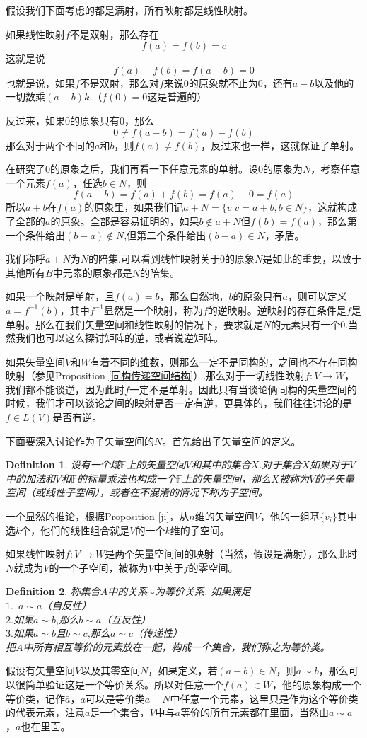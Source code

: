 \documentclass[11pt,a4paper,openany]{book}%
\theoremstyle{plain}%
\newtheorem{defi}{Definition}[chapter]%
\begin{document}
假设我们下面考虑的都是满射，所有映射都是线性映射。

如果线性映射$f$不是双射，那么存在
\[
f(a)=f(b)=c
\]
这就是说
\[
f(a)-f(b)=f(a-b)=0
\]
也就是说，如果$f$不是双射，那么对$f$来说$0$的原象就不止为0，还有$a-b$以及他的一切数乘$(a-b)k$.（$f(0)=0$这是普遍的）

反过来，如果0的原象只有0，那么
\[
0 \neq f(a-b)=f(a)-f(b)
\]
那么对于两个不同的$a$和$b$，则$f(a)\neq f(b)$，反过来也一样，这就保证了单射。

在研究了$0$的原象之后，我们再看一下任意元素的单射。设0的原象为$N$，考察任意一个元素$f(a)$，任选$b\in N$，则
\[
f(a+b)=f(a)+f(b)=f(a)+0=f(a)
\]
所以$a+b$在$f(a)$的原象里，如果我们记$a+N=\{v|v=a+b,b\in N\}$，这就构成了全部的$a$的原象。全部是容易证明的，如果$b\notin a+N$但$f(b)=f(a)$，那么第一个条件给出$(b-a) \notin N$,但第二个条件给出$(b-a) \in N$，矛盾。

我们称呼$a+N$为$N$的{\kaishu 陪集}.可以看到线性映射关于0的原象$N$是如此的重要，以致于其他所有$B$中元素的原象都是$N$的陪集。

如果一个映射是单射，且$f(a)=b$，那么自然地，$b$的原象只有$a$，则可以定义$a=f^{-1}(b)$，其中$f^{-1}$显然是一个映射，称为$f$的逆映射。逆映射的存在条件是$f$是单射。那么在我们矢量空间和线性映射的情况下，要求就是$N$的元素只有一个0.当然我们也可以这么探讨矩阵的逆，或者说逆矩阵。

如果矢量空间$V$和$W$有着不同的维数，则那么一定不是同构的，之间也不存在同构映射（参见Proposition \ref{同构传递空间结构}）.那么对于一切线性映射$f:V\rightarrow W$，我们都不能谈逆，因为此时$f$一定不是单射。因此只有当谈论俩同构的矢量空间的时候，我们才可以谈论之间的映射是否一定有逆，更具体的，我们往往讨论的是$f\in L(V)$是否有逆。

下面要深入讨论作为子矢量空间的$N$。首先给出子矢量空间的定义。
\begin{defi}
设有一个域$\mathbb{F}$上的矢量空间$V$和其中的集合$X$.对于集合$X$如果对于$V$中的加法和$V$和$\mathbb{F}$的标量乘法也构成一个$\mathbb{F}$上的矢量空间，那么$X$被称为$V$的子矢量空间（或线性子空间），或者在不混淆的情况下称为子空间。
\end{defi}
\indent 一个显然的推论，根据Proposition \ref{ji}，从$n$维的矢量空间$V$，他的一组基$\{v_i\}$其中选$k$个，他们的线性组合就是$V$的一个$k$维的子空间。

如果线性映射$f:V\rightarrow W$是两个矢量空间间的映射（当然，假设是满射），那么此时$N$就成为$V$的一个子空间，被称为$V$中关于$f$的零空间。
\begin{defi}
称集合$A$中的关系$\sim$为等价关系. 如果满足\\
$1.$\,\,\,$a\sim a$（自反性）\\
$2.$如果$a\sim b$,那么$b\sim a$（互反性）\\
$3.$如果$a\sim b$且$b\sim c$,那么$a\sim c$（传递性）\\
把$A$中所有相互等价的元素放在一起，构成一个集合，我们称之为等价类。
\end{defi}
假设有矢量空间$V$以及其零空间$N$，如果定义，若$(a-b)\in N$，则$a\sim b$，那么可以很简单验证这是一个等价关系。所以对任意一个$f(a)\in W$，他的原象构成一个等价类，记作$\bar{a}$，$a$可以是等价类$a+N$中任意一个元素，这里只是作为这个等价类的代表元素，注意$\bar{a}$是一个集合，$V$中与$a$等价的所有元素都在里面，当然由$a\sim a$，$a$也在里面。
\end{document}
